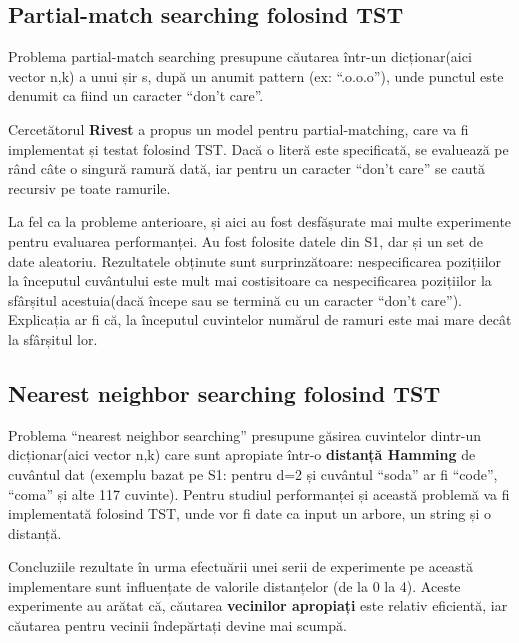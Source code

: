 \documentclass[12pt,a4paper]{article}
\begin{document}
\begin{singlespace}
\subsection{Partial-match searching folosind TST}
Problema partial-match searching presupune căutarea într-un dicționar(aici vector n,k) a unui șir s, după un anumit pattern (ex: “.o.o.o”), unde punctul este denumit ca fiind un caracter “don’t care”. 
\par
Cercetătorul \textbf{Rivest} a propus un model pentru partial-matching, care va fi implementat și testat folosind TST. Dacă o literă este specificată, se evaluează pe rând câte o singură ramură dată, iar pentru un caracter “don’t care” se caută recursiv pe toate ramurile.
\par
La fel ca la probleme anterioare, și aici au fost desfășurate mai multe experimente pentru evaluarea performanței. Au fost folosite datele din S1, dar și un set de date aleatoriu. Rezultatele obținute sunt surprinzătoare: nespecificarea pozițiilor la începutul cuvântului este mult mai costisitoare ca nespecificarea pozițiilor la sfârșitul acestuia(dacă începe sau se termină cu un caracter “don’t care”). Explicația ar fi că, la începutul cuvintelor numărul de ramuri este mai mare decât la sfârșitul lor.

\subsection{Nearest neighbor searching folosind TST}
Problema “nearest neighbor searching” presupune găsirea cuvintelor dintr-un dicționar(aici vector n,k) care sunt apropiate într-o \textbf{distanță Hamming} de cuvântul dat (exemplu bazat pe S1: pentru d=2 și cuvântul “soda” ar fi “code”, “coma” și alte 117 cuvinte). Pentru studiul performanței și această problemă va fi implementată folosind TST, unde vor fi date ca input un arbore, un string și o distanță. 
\par
Concluziile rezultate în urma efectuării unei serii de experimente pe această implementare sunt influențate de valorile distanțelor (de la 0 la 4). Aceste experimente au arătat că, căutarea \textbf{vecinilor apropiați} este relativ eficientă, iar căutarea pentru vecinii îndepărtați devine mai scumpă.


\end{singlespace}
\end{document}
